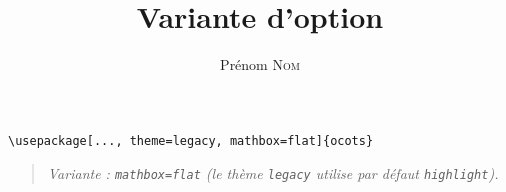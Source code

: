 \documentclass[11pt]{ocots-book}
\title{Variante d'option}
\author{Prénom \textsc{Nom}}
\newcommand{\ocotsvariantnote}[1]{\begin{quote}\itshape Variante : #1\end{quote}}
\begin{document}
\maketitle

\begin{lstlisting}
\usepackage[..., theme=legacy, mathbox=flat]{ocots}
\end{lstlisting}
\ocotsvariantnote{\texttt{mathbox=flat} (le th\`eme \texttt{legacy} utilise par d\'efaut \texttt{highlight}).}

\end{document}

